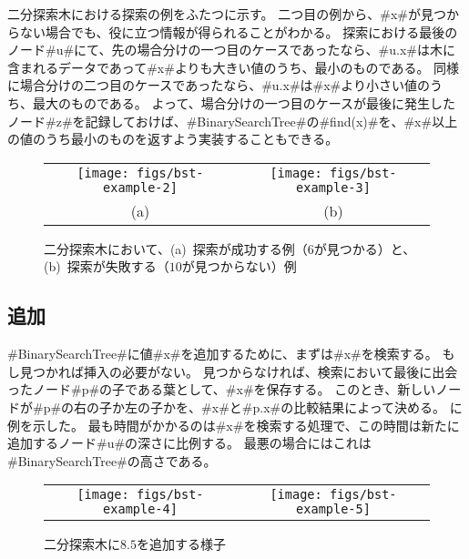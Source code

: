 二分探索木における探索の例をふたつに示す。
二つ目の例から、#x#が見つからない場合でも、役に立つ情報が得られることがわかる。
探索における最後のノード#u#にて、先の場合分けの一つ目のケースであったなら、#u.x#は木に含まれるデータであって#x#よりも大きい値のうち、最小のものである。
同様に場合分けの二つ目のケースであったなら、#u.x#は#x#より小さい値のうち、最大のものである。
よって、場合分けの一つ目のケースが最後に発生したノード#z#を記録しておけば、#BinarySearchTree#の#find(x)#を、#x#以上の値のうち最小のものを返すよう実装することもできる。

\begin{figure}
  \begin{center}
    \begin{tabular}{cc}
    \texttt{[image: figs/bst-example-2]} &
    \texttt{[image: figs/bst-example-3]} \\
    (a) & (b)
    \end{tabular}
  \end{center}
  \caption{二分探索木において、(a)~探索が成功する例（$6$が見つかる）と、(b)~探索が失敗する（$10$が見つからない）例}
\end{figure}


\subsection{追加}

#BinarySearchTree#に値#x#を追加するために、まずは#x#を検索する。
もし見つかれば挿入の必要がない。
見つからなければ、検索において最後に出会ったノード#p#の子である葉として、#x#を保存する。
このとき、新しいノードが#p#の右の子か左の子かを、#x#と#p.x#の比較結果によって決める。
に例を示した。
最も時間がかかるのは#x#を検索する処理で、この時間は新たに追加するノード#u#の深さに比例する。
最悪の場合にはこれは#BinarySearchTree#の高さである。

\begin{figure}
  \begin{center}
    \begin{tabular}{cc}
    \texttt{[image: figs/bst-example-4]} &
    \texttt{[image: figs/bst-example-5]}
    \end{tabular}
  \end{center}
  \caption{二分探索木に$8.5$を追加する様子}
\end{figure}


